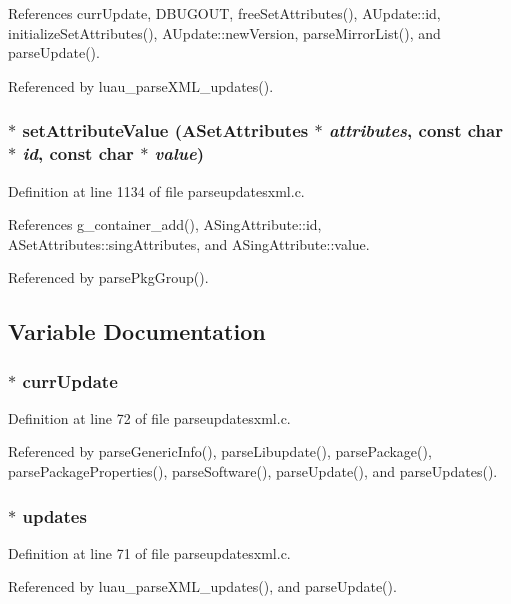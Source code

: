 References curr\-Update, DBUGOUT, free\-Set\-Attributes(), AUpdate::id, initialize\-Set\-Attributes(), AUpdate::new\-Version, parse\-Mirror\-List(), and parse\-Update().

Referenced by luau\_\-parse\-XML\_\-updates().
\subsubsection{ $\ast$ set\-Attribute\-Value ({\bf ASet\-Attributes} $\ast$ {\em attributes}, const char $\ast$ {\em id}, const char $\ast$ {\em value})\hspace{0.3cm}{\tt  [static]}}\label{parseupdatesxml_8c_a22}




Definition at line 1134 of file parseupdatesxml.c.

References g\_\-container\_\-add(), ASing\-Attribute::id, ASet\-Attributes::sing\-Attributes, and ASing\-Attribute::value.

Referenced by parse\-Pkg\-Group().

\subsection{Variable Documentation}
\subsubsection{$\ast$ {\bf curr\-Update}\hspace{0.3cm}{\tt  [static]}}\label{parseupdatesxml_8c_a1}




Definition at line 72 of file parseupdatesxml.c.

Referenced by parse\-Generic\-Info(), parse\-Libupdate(), parse\-Package(), parse\-Package\-Properties(), parse\-Software(), parse\-Update(), and parse\-Updates().
\subsubsection{$\ast$ {\bf updates}\hspace{0.3cm}{\tt  [static]}}\label{parseupdatesxml_8c_a0}




Definition at line 71 of file parseupdatesxml.c.

Referenced by luau\_\-parse\-XML\_\-updates(), and parse\-Update().